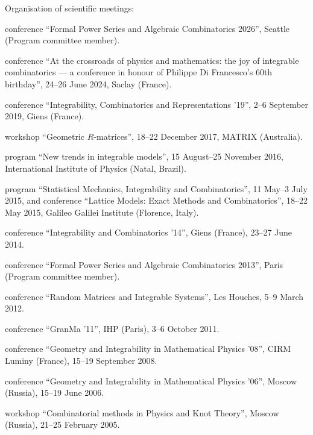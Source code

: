 \begin{cvbullets}
\item Organisation of scientific meetings:
\begin{cvitems}
\item conference ``Formal Power Series and Algebraic Combinatorics 2026'', Seattle (Program committee member).
\item conference ``At the crossroads of physics and mathematics: the joy of integrable combinatorics --- a conference in honour of Philippe Di Francesco's 60th birthday'', 24--26 June 2024, Saclay (France).
\item conference ``Integrability, Combinatorics and Representations '19'', 2--6 September 2019, Giens (France).
\item workshop ``Geometric $R$-matrices'', 18--22 December 2017, MATRIX (Australia).
\item program ``New trends in integrable models'', 15 August--25 November 2016, International Institute of Physics (Natal, Brazil).
\item program ``Statistical Mechanics, Integrability and Combinatorics'', 11 May--3 July 2015, and conference ``Lattice Models: Exact Methods and Combinatorics'', 18--22 May 2015, Galileo Galilei Institute (Florence, Italy).
\item conference ``Integrability and Combinatorics '14'', Giens (France), 23--27 June 2014.
\item conference ``Formal Power Series and Algebraic Combinatorics 2013'', Paris (Program committee member).
\item conference ``Random Matrices and Integrable Systems'', Les Houches, 5--9 March 2012.
\item conference ``GranMa '11'', IHP (Paris), 3--6 October 2011.
\item conference ``Geometry and Integrability in Mathematical Physics '08'', CIRM Luminy (France), 15--19 September 2008.
\item conference ``Geometry and Integrability in Mathematical Physics '06'', Moscow (Russia), 15--19 June 2006.
\item workshop ``Combinatorial methods in Physics and Knot Theory'', Moscow (Russia), 21--25 February 2005.
\end{cvitems}


\end{cvbullets}
